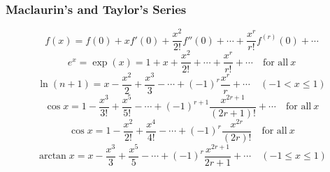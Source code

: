\documentclass{book}
\begin{document}
            \subsubsection{Maclaurin's and Taylor's Series}
            \begin{equation}
                f(x)=f(0)+xf'(0)+\frac{x^2}{2!}f''(0)+\cdots+\frac{x^r}{r!}f^{(r)}(0)+\cdots
            \end{equation}
            \begin{equation}
                e^x=\exp(x)=1+x+\frac{x^2}{2!}+\cdots+\frac{x^r}{r!}+\cdots\quad\text{for all}\ x
            \end{equation}
            \begin{equation}
                \ln(n+1)=x-\frac{x^2}{2}+\frac{x^3}{3}-\cdots+(-1)^r\frac{x^r}{r}+\cdots\quad(-1<x\le1)
            \end{equation}
            \begin{equation}
                \cos x=1-\frac{x^3}{3!}+\frac{x^5}{5!}-\cdots+(-1)^{r+1}\frac{x^{2r+1}}{(2r+1)!}+\cdots\quad\text{for all}\ x
            \end{equation}
            \begin{equation}
                \cos x=1-\frac{x^2}{2!}+\frac{x^4}{4!}-\cdots+(-1)^r\frac{x^{2r}}{(2r)!}\quad\text{for all}\ x
            \end{equation}
            \begin{equation}
                \arctan x=x-\frac{x^3}{3}+\frac{x^5}{5}-\cdots+(-1)^r\frac{x^{2r+1}}{2r+1}+\cdots\quad(-1\le x\le1)
            \end{equation}
\end{document}
